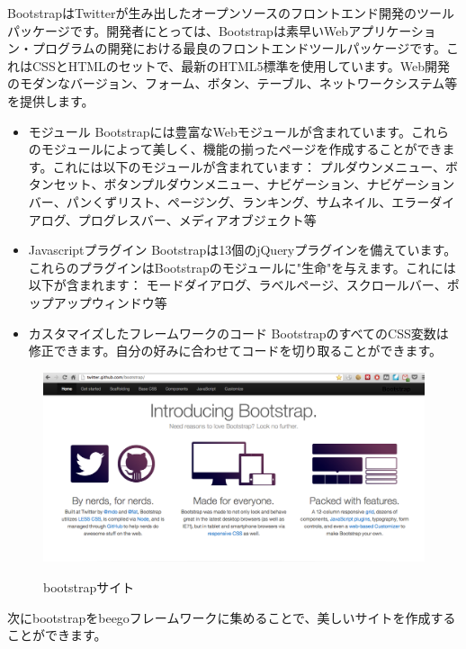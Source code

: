 BootstrapはTwitterが生み出したオープンソースのフロントエンド開発のツールパッケージです。開発者にとっては、Bootstrapは素早いWebアプリケーション・プログラムの開発における最良のフロントエンドツールパッケージです。これはCSSとHTMLのセットで、最新のHTML5標準を使用しています。Web開発のモダンなバージョン、フォーム、ボタン、テーブル、ネットワークシステム等を提供します。


\begin{itemize}
  \item モジュール Bootstrapには豊富なWebモジュールが含まれています。これらのモジュールによって美しく、機能の揃ったページを作成することができます。これには以下のモジュールが含まれています： プルダウンメニュー、ボタンセット、ボタンプルダウンメニュー、ナビゲーション、ナビゲーションバー、パンくずリスト、ページング、ランキング、サムネイル、エラーダイアログ、プログレスバー、メディアオブジェクト等
  \item Javascriptプラグイン Bootstrapは13個のjQueryプラグインを備えています。これらのプラグインはBootstrapのモジュールに"生命"を与えます。これには以下が含まれます： モードダイアログ、ラベルページ、スクロールバー、ポップアップウィンドウ等
  \item カスタマイズしたフレームワークのコード BootstrapのすべてのCSS変数は修正できます。自分の好みに合わせてコードを切り取ることができます。
\end{itemize}


\begin{figure}[H]
   \includegraphics[width=14cm]{14.1.bootstrap.png}
   \label{図14.1}
   \caption{bootstrapサイト}
\end{figure}



次にbootstrapをbeegoフレームワークに集めることで、美しいサイトを作成することができます。

